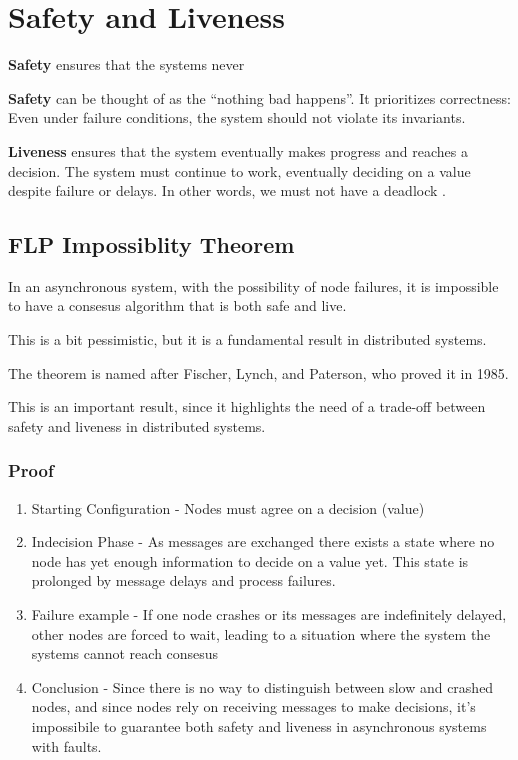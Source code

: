 \section{Safety and Liveness}

\textbf{Safety} ensures that the systems never 

\textbf{Safety} can be thought of as the ``nothing bad happens''.
It prioritizes correctness: Even under failure conditions, the system should not violate its invariants.

\textbf{Liveness} ensures that the system eventually makes progress and reaches a decision.
The system must continue to work, eventually deciding on a value despite failure or delays.
In other words, we must not have a deadlock \smiley.




\subsection{FLP Impossiblity Theorem}
\begin{definition}
   In an asynchronous system, with the possibility of node failures, it is impossible to have a consesus algorithm that is both safe and live.
\end{definition}
This is a bit pessimistic, but it is a fundamental result in distributed systems.

The theorem is named after Fischer, Lynch, and Paterson, who proved it in 1985.


This is an important result, since it highlights the need of a trade-off between safety and liveness in distributed systems.

\subsubsection{Proof}
\begin{enumerate}
   \item Starting Configuration - Nodes must agree on a decision (value)  
   \item Indecision Phase - As messages are exchanged there exists a state where no node has yet enough information to decide on a value yet. 
   This state is prolonged by message delays and process failures.
   \item Failure example -  If one node crashes or its messages are indefinitely delayed, other nodes are forced to wait, leading to a situation where the system the systems cannot reach consesus
   \item Conclusion -  Since there is no way to distinguish between slow and crashed nodes, and since nodes rely on receiving messages to make decisions, it's impossibile to guarantee both safety and liveness in asynchronous systems with faults.
\end{enumerate}

